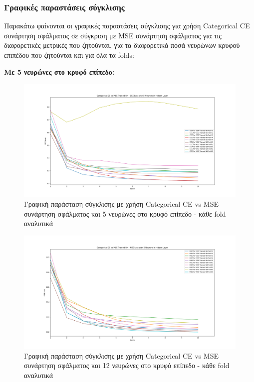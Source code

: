 \documentclass[12pt,a4paper]{article}
\begin{document}
\subsubsection{Γραφικές παραστάσεις σύγκλισης}

Παρακάτω φαίνονται οι γραφικές παραστάσεις σύγκλισης για χρήση Categorical CE συνάρτηση σφάλματος σε σύγκριση με MSE συνάρτηση σφάλματος για τις διαφορετικές μετρικές που ζητούνται, για τα διαφορετικά ποσά νευρώνων κρυφού επιπέδου που ζητούνται και για όλα τα folds:

\textbf{Με 5 νευρώνες στο κρυφό επίπεδο:}

\begin{figure}[H]
	\includegraphics[width=\textwidth]{1. CCE vs MSE - CCE Loss - 5 Neurons.png}
	\caption{Γραφική παράσταση σύγκλισης με χρήση Categorical CE vs MSE συνάρτηση σφάλματος και 5 νευρώνες στο κρυφό επίπεδο - κάθε fold αναλυτικά}
\end{figure}

\begin{figure}[H]
	\includegraphics[width=\textwidth]{2. CCE vs MSE - MSE Loss - 5 Neurons.png}
	\caption{Γραφική παράσταση σύγκλισης με χρήση Categorical CE vs MSE συνάρτηση σφάλματος και 12 νευρώνες στο κρυφό επίπεδο - κάθε fold αναλυτικά}
\end{figure}
\end{document}
